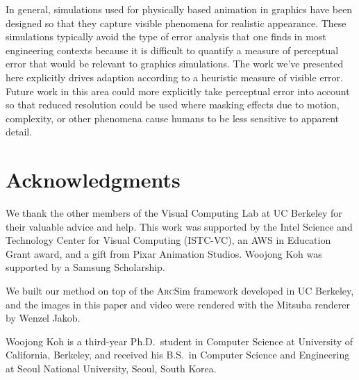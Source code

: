 \documentclass[10pt,journal,compsoc,twoside]{TexInputs/IEEEtran}
\newcommand{\arcsim}{\textsc{Arc}Sim\xspace}
\begin{document}
\vspace{.1in}

In general, simulations used for physically based animation in
graphics have been designed so that they capture visible phenomena for
realistic appearance.  These simulations typically avoid the type of
error analysis that one finds in most engineering contexts because it
is difficult to quantify a measure of perceptual error that would be
relevant to graphics simulations.  The work we've presented here
explicitly drives adaption according to a heuristic measure of visible
error.  Future work in this area could more explicitly
take perceptual error into account so that reduced resolution could be
used where masking effects due to motion, complexity, or other
phenomena cause humans to be less sensitive to apparent detail.



\section*{Acknowledgments}
We thank the other members of the Visual Computing Lab at UC Berkeley for their
valuable advice and help. This work was supported by the Intel Science and Technology
Center for Visual Computing (ISTC-VC), an AWS in Education Grant
award, and a gift from Pixar Animation Studios.  Woojong Koh was supported by a
Samsung Scholarship.

We built our method on top of the \arcsim framework developed in UC Berkeley, and the
images in this paper and video were rendered with the Mitsuba renderer by Wenzel Jakob.

\vspace*{.1in}





\begin{IEEEbiography}
{Woojong Koh} is a third-year Ph.D.~student in Computer Science at University of
California, Berkeley, and received his B.S.~in Computer Science and Engineering at Seoul
National University, Seoul, South Korea.
\end{IEEEbiography}
\end{document}
